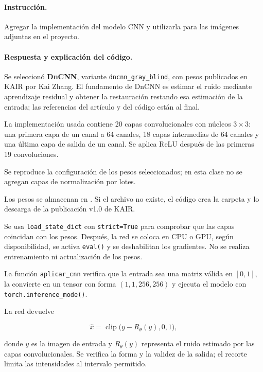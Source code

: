 \documentclass[11pt]{article}
\begin{document}
\paragraph{Instrucción.}

Agregar la implementación del modelo CNN y utilizarla para
las imágenes adjuntas en el proyecto.

\paragraph{Respuesta y explicación del código.}

Se seleccionó \textbf{DnCNN}, variante
\texttt{dncnn\_gray\_blind}, con pesos publicados en KAIR por
Kai Zhang. El fundamento de DnCNN es estimar el ruido
mediante aprendizaje residual y obtener la restauración
restando esa estimación de la entrada; las referencias del
artículo y del código están al final.

La implementación usada contiene 20 capas convolucionales
con núcleos $3\times3$: una primera capa de un canal a
64 canales, 18 capas intermedias de 64 canales y una última
capa de salida de un canal. Se aplica ReLU después de las
primeras 19 convoluciones.

Se reproduce la configuración de los pesos seleccionados;
en esta clase no se agregan capas de normalización por lotes.

Los pesos se almacenan en
.
Si el archivo no existe, el código crea la carpeta y lo
descarga de la publicación v1.0 de KAIR.

Se usa \texttt{load\_state\_dict} con
\texttt{strict=True} para comprobar que las capas coincidan
con los pesos. Después, la red se coloca en CPU o GPU,
según disponibilidad, se activa \texttt{eval()} y se
deshabilitan los gradientes. No se realiza entrenamiento
ni actualización de los pesos.

La función \texttt{aplicar\_cnn} verifica que la entrada
sea una matriz válida en $[0,1]$, la convierte en un tensor
con forma $(1,1,256,256)$ y ejecuta el modelo con
\texttt{torch.inference\_mode()}.

La red devuelve

\begin{equation}
    \widehat{x}
    =
    \operatorname{clip}
    \bigl(y-R_{\theta}(y),0,1\bigr),
\end{equation}

donde $y$ es la imagen de entrada y $R_{\theta}(y)$
representa el ruido estimado por las capas convolucionales.
Se verifica la forma y la validez de la salida; el recorte
limita las intensidades al intervalo permitido.
\end{document}
